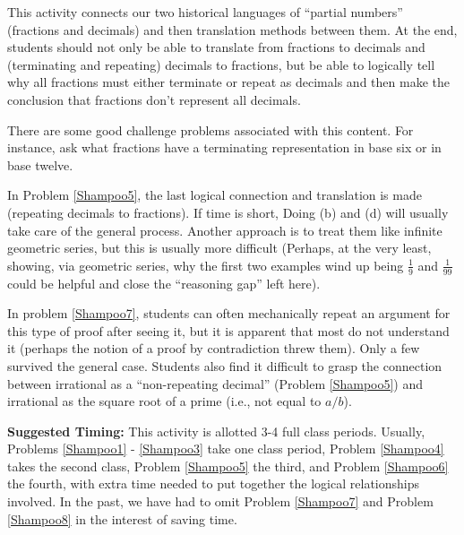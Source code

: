 \documentclass{ximera}
\begin{document}
\newpage
\begin{instructorNotes}
This activity connects our two historical languages of ``partial numbers'' (fractions and decimals) and then translation methods between them.  At the end, students should not only be able to translate from fractions to decimals and (terminating and repeating) decimals to fractions, but be able to logically tell why all fractions must either terminate or repeat as decimals and then make the conclusion that fractions don't represent all decimals.

There are some good challenge problems associated with this content.  For instance, ask what fractions have a terminating representation in base six or in base twelve.


In Problem \ref{Shampoo5}, the last logical connection and translation is made (repeating decimals to fractions).  If time is short, Doing (b) and (d) will usually take care of the general process.  Another approach is to treat them like infinite geometric series, but this is usually more difficult (Perhaps, at the very least, showing, via geometric series, why the first two examples wind up being $\frac19$ and $\frac{1}{99}$ could be helpful and close the ``reasoning gap'' left here).


In problem \ref{Shampoo7}, students can often mechanically repeat an argument for this type of proof after seeing it, but it is apparent that most do not understand it (perhaps the notion of a proof by contradiction threw them).  Only a few survived the general case.  Students also find it difficult to grasp the connection between irrational as a ``non-repeating decimal'' (Problem \ref{Shampoo5}) and irrational as the square root of a prime (i.e., not equal to $a/b$).




{\bf Suggested Timing:} This activity is allotted 3-4 full class periods.  Usually, Problems \ref{Shampoo1} - \ref{Shampoo3} take one class period, Problem \ref{Shampoo4} takes the second class, Problem \ref{Shampoo5} the third, and Problem \ref{Shampoo6} the fourth, with extra time needed to put together the logical relationships involved.  In the past, we have had to omit Problem \ref{Shampoo7} and Problem \ref{Shampoo8} in the interest of saving time.  
\end{instructorNotes}
\end{document}
